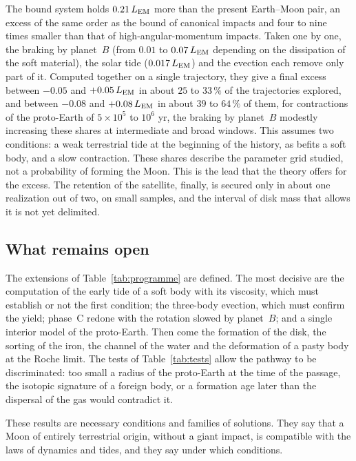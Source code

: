 \documentclass[11pt,a4paper]{article}
\newcommand{\LEM}{\ensuremath{L_{\rm EM}}}
\begin{document}
The bound system holds $0.21\,\LEM$ more than the present Earth--Moon pair, an excess of the same order as the bound of canonical impacts and four to nine times smaller than that of high-angular-momentum impacts. Taken one by one, the braking by planet~$B$ (from $0.01$ to $0.07\,\LEM$ depending on the dissipation of the soft material), the solar tide ($0.017\,\LEM$) and the evection each remove only part of it. Computed together on a single trajectory, they give a final excess between $-0.05$ and $+0.05\,\LEM$ in about $25$ to $33\,\%$ of the trajectories explored, and between $-0.08$ and $+0.08\,\LEM$ in about $39$ to $64\,\%$ of them, for contractions of the proto-Earth of $5\times10^5$ to $10^6$ yr, the braking by planet~$B$ modestly increasing these shares at intermediate and broad windows. This assumes two conditions: a weak terrestrial tide at the beginning of the history, as befits a soft body, and a slow contraction. These shares describe the parameter grid studied, not a probability of forming the Moon. This is the lead that the theory offers for the excess. The retention of the satellite, finally, is secured only in about one realization out of two, on small samples, and the interval of disk mass that allows it is not yet delimited.

\subsection*{What remains open}

The extensions of Table~\ref{tab:programme} are defined. The most decisive are the computation of the early tide of a soft body with its viscosity, which must establish or not the first condition; the three-body evection, which must confirm the yield; phase~C redone with the rotation slowed by planet~$B$; and a single interior model of the proto-Earth. Then come the formation of the disk, the sorting of the iron, the channel of the water and the deformation of a pasty body at the Roche limit. The tests of Table~\ref{tab:tests} allow the pathway to be discriminated: too small a radius of the proto-Earth at the time of the passage, the isotopic signature of a foreign body, or a formation age later than the dispersal of the gas would contradict it.

\medskip
These results are necessary conditions and families of solutions. They say that a Moon of entirely terrestrial origin, without a giant impact, is compatible with the laws of dynamics and tides, and they say under which conditions.
\end{document}
